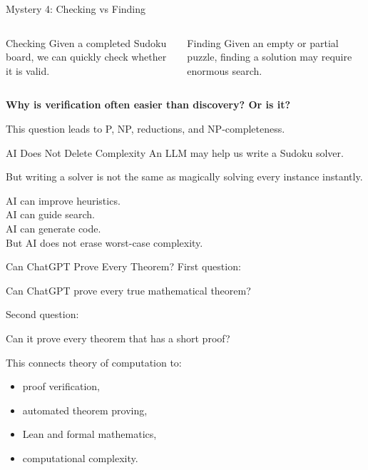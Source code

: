 \documentclass[10pt,aspectratio=169]{beamer}
\newcommand{\BigQ}[1]{\begin{center}\Large\bfseries #1\end{center}}
\newcommand{\tagline}[1]{\begin{center}\alert{#1}\end{center}}
\begin{document}
\begin{frame}{Mystery 4: Checking vs Finding}
\begin{columns}[T,totalwidth=\textwidth]
\begin{block}{Checking}
Given a completed Sudoku board, we can quickly check whether it is valid.
\end{block}

\begin{block}{Finding}
Given an empty or partial puzzle, finding a solution may require enormous search.
\end{block}
\end{columns}

\pause
\vspace{1.5em}
\BigQ{Why is verification often easier than discovery? Or is it?}

\pause
\tagline{This question leads to P, NP, reductions, and NP-completeness.}
\end{frame}

\begin{frame}{AI Does Not Delete Complexity}
An LLM may help us write a Sudoku solver.

\pause
\vspace{0.8em}
But writing a solver is not the same as magically solving every instance instantly.

\pause
\vspace{1.2em}
\begin{center}
\Large
AI can improve heuristics.\\[0.4em]
AI can guide search.\\[0.4em]
AI can generate code.\\[0.4em]
\alert{But AI does not erase worst-case complexity.}
\end{center}
\end{frame}

\begin{frame}{Can ChatGPT Prove Every Theorem?}
First question:

\begin{center}
\Large
Can ChatGPT prove every true mathematical theorem?
\end{center}

\pause
Second question:

\begin{center}
\Large
Can it prove every theorem that has a short proof?
\end{center}

\pause
\vspace{1em}
This connects theory of computation to:

\begin{itemize}
    \item proof verification,
    \item automated theorem proving,
    \item Lean and formal mathematics,
    \item computational complexity.
\end{itemize}
\end{frame}
\end{document}
